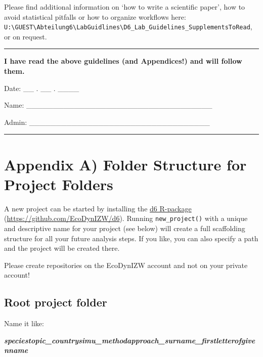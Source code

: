 \documentclass[
  english,
]{article}
\begin{document}
Please find additional information on `how to write a scientific paper',
how to avoid statistical pitfalls or how to organize workflows here:
\texttt{U:\textbackslash{}GUEST\textbackslash{}Abteilung6\textbackslash{}LabGuidlines\textbackslash{}D6\_Lab\_Guidelines\_SupplementsToRead},
or on request.

\newpage

\begin{center}\rule{0.5\linewidth}{0.5pt}\end{center}

\textbf{I have read the above guidelines (and Appendices!) and will
follow them.}

Date: \_\_ . \_\_ . \_\_\_\_

Name:
\_\_\_\_\_\_\_\_\_\_\_\_\_\_\_\_\_\_\_\_\_\_\_\_\_\_\_\_\_\_\_\_\_\_\_

Admin:
\_\_\_\_\_\_\_\_\_\_\_\_\_\_\_\_\_\_\_\_\_\_\_\_\_\_\_\_\_\_\_\_\_\_

\begin{center}\rule{0.5\linewidth}{0.5pt}\end{center}

\newpage

\hypertarget{appendix-a-folder-structure-for-project-folders}{%
\section{Appendix A) Folder Structure for Project
Folders}\label{appendix-a-folder-structure-for-project-folders}}

A new project can be started by installing the
\href{https://github.com/EcoDynIZW/d6}{d6 R-package}
(\url{https://github.com/EcoDynIZW/d6}). Running \texttt{new\_project()}
with a unique and descriptive name for your project (see below) will
create a full scaffolding structure for all your future analysis steps.
If you like, you can also specify a path and the project will be created
there.

Please create repositories on the EcoDynIZW account and not on your
private account!

\hypertarget{root-project-folder}{%
\subsection{Root project folder}\label{root-project-folder}}

Name it like:

\textbf{\emph{species\textbar topic\_country\textbar simu\_method\textbar approach\_surname\_firstletterofgivenname}}
\end{document}
